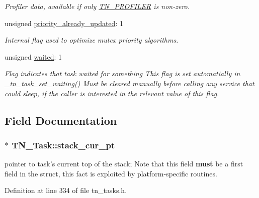 \begin{DoxyCompactItemize}
\begin{DoxyCompactList}\small\item\em Profiler data, available if only {\ttfamily \hyperlink{tn__cfg__default_8h_a49a546b18cc1f75b51d4cf8b290634dd}{T\+N\+\_\+\+P\+R\+O\+F\+I\+L\+E\+R}} is non-\/zero. \end{DoxyCompactList}\item 
unsigned \hyperlink{structTN__Task_abb4d22974c7317dd610f646b9048656d}{priority\+\_\+already\+\_\+updated}\+: 1
\begin{DoxyCompactList}\small\item\em Internal flag used to optimize mutex priority algorithms. \end{DoxyCompactList}\item 
unsigned \hyperlink{structTN__Task_a47c3a0a27be1ee526a1599a2ca8bb269}{waited}\+: 1
\begin{DoxyCompactList}\small\item\em Flag indicates that task waited for something This flag is set automatially in {\ttfamily \+\_\+tn\+\_\+task\+\_\+set\+\_\+waiting()} Must be cleared manually before calling any service that could sleep, if the caller is interested in the relevant value of this flag. \end{DoxyCompactList}\end{DoxyCompactItemize}


\subsection{Field Documentation}
\hypertarget{structTN__Task_a9354fa4b328e10ee9f8adb032e643892}{
\subsubsection[{stack\+\_\+cur\+\_\+pt}]{$\ast$ T\+N\+\_\+\+Task\+::stack\+\_\+cur\+\_\+pt}}\label{structTN__Task_a9354fa4b328e10ee9f8adb032e643892}


pointer to task's current top of the stack; Note that this field {\bfseries must} be a first field in the struct, this fact is exploited by platform-\/specific routines. 



Definition at line 334 of file tn\+\_\+tasks.\+h.

